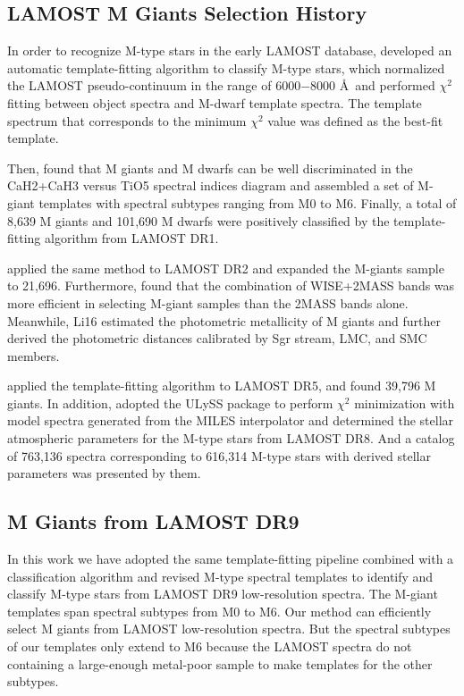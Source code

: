 \documentclass[manuscript]{aastex62}
\begin{document}
\begin{CJK*}{UTF8}{gbsn}
\subsection{LAMOST M Giants Selection History }
In order to recognize M-type stars in the early LAMOST database, \citet{2015AJ....150...42Z} developed an automatic template-fitting algorithm to classify M-type stars, which normalized the LAMOST pseudo-continuum in the range of 6000$-$8000 \AA~and performed $\chi^{2}$ fitting between object spectra and M-dwarf template spectra. The template spectrum that corresponds to the minimum $\chi^{2}$ value was defined as the best-fit template.

Then, \citet{2015RAA....15.1154Z} found that M giants and M dwarfs can be well discriminated in the CaH2+CaH3 versus TiO5 spectral indices diagram and assembled a set of M-giant templates with spectral subtypes ranging from M0 to M6. Finally, a total of 8,639 M giants and 101,690 M dwarfs were positively classified by the template-fitting algorithm from LAMOST DR1. 

\citet{2016RAA....16..125L} applied the same method to LAMOST DR2 and expanded the M-giants sample to 21,696. Furthermore, \citet[hereafter Li16]{2016ApJ...823...59L} found that the combination of WISE+2MASS \citep{2006AJ....131.1163S,2010AJ....140.1868W} bands was more efficient in selecting M-giant samples than the 2MASS bands alone. Meanwhile, Li16 estimated the photometric metallicity of M giants and further derived the photometric distances calibrated by Sgr stream, LMC, and SMC members.   

\citet[hereafter Z19]{2019ApJS..244....8Z} applied the template-fitting algorithm to LAMOST DR5, and found 39,796 M giants. In addition, \citet{2022ApJS..260...45D} adopted the ULySS package \citep{2009A&A...501.1269K} to perform $\chi^{2}$ minimization with model spectra generated from the MILES interpolator \citep{2006MNRAS.371..703S,2011A&A...532A..95F} and determined the stellar atmospheric parameters for the M-type stars from LAMOST DR8. And a catalog of 763,136 spectra corresponding to 616,314 M-type stars with derived stellar parameters was presented by them.

\subsection{M Giants from LAMOST DR9}
In this work we have adopted the same template-fitting pipeline combined with a classification algorithm \citep{2015AJ....150...42Z} and revised M-type spectral templates \citep{2015RAA....15.1154Z} to identify and classify M-type stars from LAMOST DR9 low-resolution spectra. The M-giant templates span spectral subtypes from M0 to M6. 
Our method can efficiently select M giants from LAMOST low-resolution spectra. But the spectral subtypes of our templates only extend to M6 because the LAMOST spectra do not containing a large-enough metal-poor sample to make templates for the other subtypes.


\end{CJK*}
\end{document}
